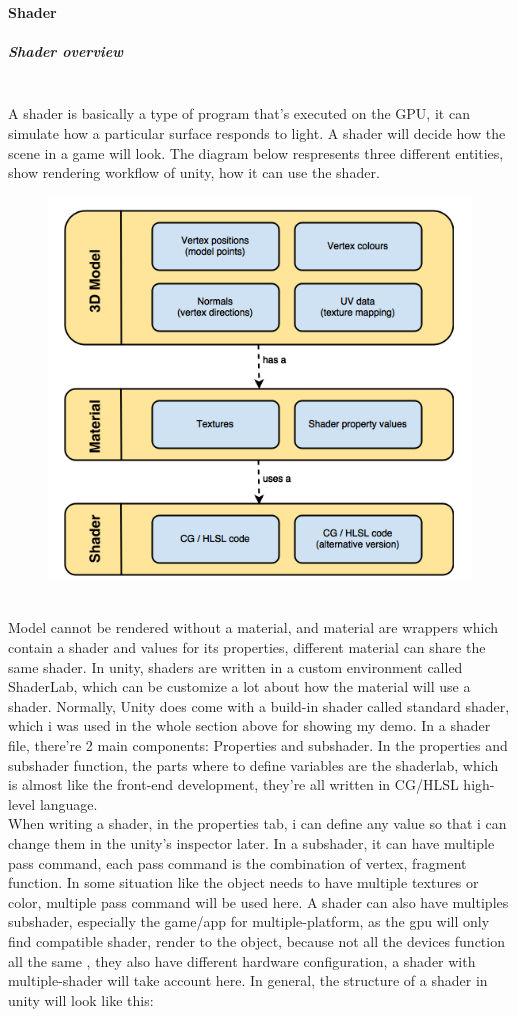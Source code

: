 \documentclass[a4paper, 13pt]{extarticle}
\begin{document}
{ \paragraph{Shader} \vspace{-0.2cm}
 \subparagraph{Shader overview} ~\\[0.1cm]
 A shader is basically a type of program that's executed on the GPU, it can simulate how a particular surface responds to light. A shader will decide how the scene in a game will look. The diagram below respresents three different entities, show rendering workflow of unity, how it can use the shader. 
 \begin{figure}[h]
 		\begin{minipage}{1\textwidth}
 			\centering
 			\includegraphics[width=0.45\linewidth]{intructions/Shader_workflow.png}
 			\centering
 		\end{minipage}
 \end{figure}
\\[0.01cm]
   Model cannot be rendered without a material, and material are wrappers which contain a shader and values for its properties, different material can share the same shader. In unity, shaders are written in a custom environment called ShaderLab, which can be customize a lot about how the material will use a shader. Normally, Unity does come with a build-in shader called standard shader, which i was used in the whole section above for showing my demo. In a shader file, there're 2 main components: Properties and subshader. In the properties and subshader function, the parts where to define variables are the shaderlab, which is almost like the front-end development, they're all written in CG/HLSL high-level language. \\
   When writing a shader, in the properties tab, i can define any value  so that i can change them in the unity's inspector later. In a subshader, it can have multiple pass command, each pass command is the combination of vertex, fragment function. In some situation like the object needs to have multiple textures or color, multiple pass command will be used here. A shader can also have multiples subshader, especially the game/app for multiple-platform, as the gpu will only find compatible shader, render to the object, because not all the devices function all the same , they also have different hardware configuration, a shader with multiple-shader will take account here. In general, the structure of a shader in unity will look like this: 
}
\end{document}

